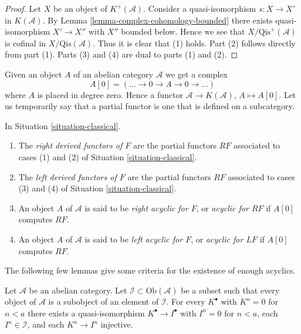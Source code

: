 \begin{proof}
Let $X$ be an object of $K^{+}(\mathcal{A})$.
Consider a quasi-isomorphism $s : X \to X'$ in $K(\mathcal{A})$.
By
Lemma \ref{lemma-complex-cohomology-bounded}
there exists quasi-isomorphism $X' \to X''$ with $X''$ bounded below.
Hence we see that $X/\text{Qis}^+(\mathcal{A})$ is cofinal
in $X/\text{Qis}(\mathcal{A})$. Thus it is clear that (1) holds.
Part (2) follows directly from part (1).
Parts (3) and (4) are dual to parts (1) and (2).
\end{proof}

\noindent
Given an object $A$ of an abelian category $\mathcal{A}$ we get a complex
$$
A[0] = ( \ldots \to 0 \to A \to 0 \to \ldots )
$$
where $A$ is placed in degree zero. Hence a functor
$\mathcal{A} \to K(\mathcal{A})$, $A \mapsto A[0]$.
Let us temporarily say that a partial functor is one that is
defined on a subcategory.

\begin{definition}
\label{definition-derived-functor}
In
Situation \ref{situation-classical}.
\begin{enumerate}
\item The {\it right derived functors of $F$} are the partial functors
$RF$ associated to cases (1) and (2) of
Situation \ref{situation-classical}.
\item The {\it left derived functors of $F$} are the partial functors
$RF$ associated to cases (3) and (4) of
Situation \ref{situation-classical}.
\item An object $A$ of $\mathcal{A}$ is said to be
{\it right acyclic for $F$}, or {\it acyclic for $RF$}
if $A[0]$ computes $RF$.
\item An object $A$ of $\mathcal{A}$ is said to be
{\it left acyclic for $F$}, or {\it acyclic for $LF$}
if $A[0]$ computes $RF$.
\end{enumerate}
\end{definition}

\noindent
The following few lemmas give some criteria for the existence of
enough acyclics.

\begin{lemma}
\label{lemma-subcategory-right-resolution}
Let $\mathcal{A}$ be an abelian category.
Let $\mathcal{I} \subset \text{Ob}(\mathcal{A})$ be a subset such
that every object of $\mathcal{A}$ is a subobject of an element of
$\mathcal{I}$. For every $K^\bullet$ with $K^n = 0$ for $n < a$
there exists a quasi-isomorphism $K^\bullet \to I^\bullet$
with $I^n = 0$ for $n < a$, each $I^n \in \mathcal{I}$, and
each $K^n \to I^n$ injective.
\end{lemma}


